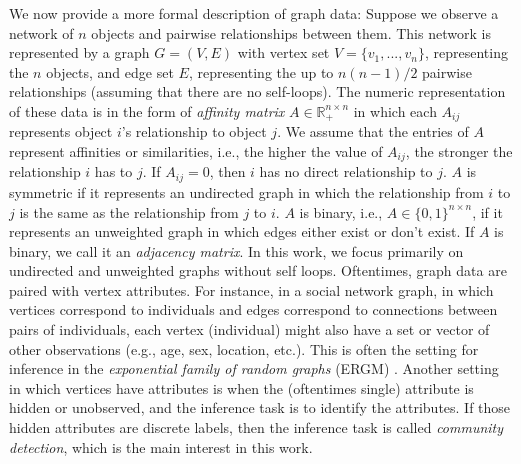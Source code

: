\documentclass[
  12pt,
]{article}
\theoremstyle{definition}
\theoremstyle{definition}
\theoremstyle{definition}
\theoremstyle{definition}
\theoremstyle{remark}
\begin{document}
We now provide a more formal description of graph data:
Suppose we observe a network of \(n\) objects and pairwise relationships between them.
This network is represented by a graph \(G = (V, E)\) with vertex set \(V = \{v_1, ..., v_n\}\), representing the \(n\) objects, and edge set \(E\), representing the up to \(n (n - 1) / 2\) pairwise relationships (assuming that there are no self-loops).
The numeric representation of these data is in the form of \emph{affinity matrix} \(A \in \mathbb{R}_+^{n \times n}\) in which each \(A_{ij}\) represents object \(i\)'s relationship to object \(j\).
We assume that the entries of \(A\) represent affinities or similarities, i.e., the higher the value of \(A_{ij}\), the stronger the relationship \(i\) has to \(j\).
If \(A_{ij} = 0\), then \(i\) has no direct relationship to \(j\).
\(A\) is symmetric if it represents an undirected graph in which the relationship from \(i\) to \(j\) is the same as the relationship from \(j\) to \(i\).
\(A\) is binary, i.e., \(A \in \{0, 1\}^{n \times n}\), if it represents an unweighted graph in which edges either exist or don't exist.
If \(A\) is binary, we call it an \emph{adjacency matrix}.
In this work, we focus primarily on undirected and unweighted graphs without self loops.
Oftentimes, graph data are paired with vertex attributes.
For instance, in a social network graph, in which vertices correspond to individuals and edges correspond to connections between pairs of individuals, each vertex (individual) might also have a set or vector of other observations (e.g., age, sex, location, etc.).
This is often the setting for inference in the \emph{exponential family of random graphs} (ERGM) \citep{kolaczyk2014statistical}.
Another setting in which vertices have attributes is when the (oftentimes single) attribute is hidden or unobserved, and the inference task is to identify the attributes.
If those hidden attributes are discrete labels, then the inference task is called \emph{community detection}, which is the main interest in this work.
\end{document}
